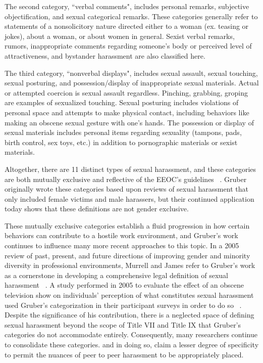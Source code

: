 The second category, ``verbal comments", includes personal remarks, subjective objectification, and sexual categorical remarks. These categories generally refer to statements of a nonsolicitory nature directed either to a woman (ex. teasing or jokes), about a woman, or about women in general. Sexist verbal remarks, rumors, inappropriate comments regarding someone's body or perceived level of attractiveness, and bystander harassment are also classified here.

The third category, ``nonverbal displays", includes sexual assault, sexual touching, sexual posturing, and possession/display of inappropriate sexual materials. Actual or attempted coercion is sexual assault regardless. Pinching, grabbing, groping are examples of sexualized touching. Sexual posturing includes violations of personal space and attempts to make physical contact, including behaviors like making an obscene sexual gesture with one's hands. The possession or display of sexual materials includes personal items regarding sexuality (tampons, pads, birth control, sex toys, etc.) in addition to pornographic materials or sexist materials.

Altogether, there are 11 distinct types of sexual harassment, and these categories are both mutually exclusive and reflective of the EEOC's guidelines ~\cite{gruber1992topology}. Gruber originally wrote these categories based upon reviews of sexual harassment that only included female victims and male harassers, but their continued application today shows that these definitions are not gender exclusive.

These mutually exclusive categories establish a fluid progression in how certain behaviors can contribute to a hostile work environment, and Gruber's work continues to influence many more recent approaches to this topic. In a 2005 review of past, present, and future directions of improving gender and minority diversity in professional environments, Murrell and James refer to Gruber's work as a cornerstone in developing a comprehensive legal definition of sexual harassment ~\cite{murrell2002pastpresentfuture}. A study performed in 2005 to evaluate the effect of an obscene television show on individuals' perception of what constitutes sexual harassment used Gruber's categorization in their participant surveys in order to do so ~\cite{berlin2005gruberverification}. Despite the significance of his contribution, there is a neglected space of defining sexual harassment beyond the scope of Title VII and Title IX that Gruber's categories do not accommodate entirely. Consequently, many researchers continue to consolidate these categories. and in doing so, claim a lesser degree of specificity to permit the nuances of peer to peer harassment to be appropriately placed.


